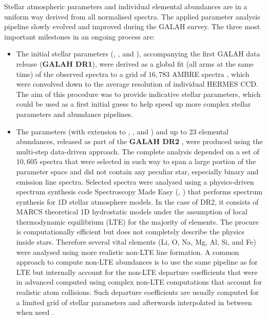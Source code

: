 Stellar atmospheric parameters and individual elemental abundances are in a uniform way derived from all normalised spectra. The applied parameter analysis pipeline slowly evolved and improved during the GALAH survey. The three most important milestones in an ongoing process are:

\begin{itemize}
	\item The initial stellar parameters (\Teff, \Logg, and \Feh), accompanying the first GALAH data release (\textbf{GALAH DR1}), were derived as a global fit (all arms at the same time) of the observed spectra to a grid of $16,783$ AMBRE spectra \cite{2012A&A...544A.126D}, which were convolved down to the average resolution of individual HERMES CCD. The aim of this procedure was to provide indicative stellar parameters, which could be used as a first initial guess to help speed up more complex stellar parameters and abundance pipelines.
	
	\item The parameters (with extension to \vsin, \vmic, and \aks) and up to 23 elemental abundances, released as part of the \textbf{GALAH DR2} \cite{buder2018}, were produced using the multi-step data-driven approach. The complete analysis depended on a set of $10,605$ spectra that were selected in such way to span a large portion of the parameter space and did not contain any peculiar star, especially binary and emission line spectra. Selected spectra were analysed using a physics-driven spectrum synthesis code Spectroscopy Made Easy (\SM, \cite{1996A&AS..118..595V, 2017A&A...597A..16P}) that performs spectrum synthesis for 1D stellar atmosphere models. In the case of DR2, it consists of MARCS theoretical 1D hydrostatic models \cite{2008A&A...486..951G} under the assumption of local thermodynamic equilibrium (LTE) for the majority of elements. The procure is computationally efficient but does not completely describe the physics inside stars. Therefore several vital elements (Li, O, Na, Mg, Al, Si, and Fe) were analysed using more realistic non-LTE line formation. A common approach to compute non-LTE abundances is to use the same pipeline as for LTE but internally account for the non-LTE departure coefficients that were in advanced computed using complex non-LTE computations that account for realistic atom collisions. Such departure coefficients are usually computed for a limited grid of stellar parameters and afterwards interpolated in between when need \cite{2020A&A...637A..80O, 2019A&A...630A.104A, 2020amarsigalah}.
	

\end{itemize}
